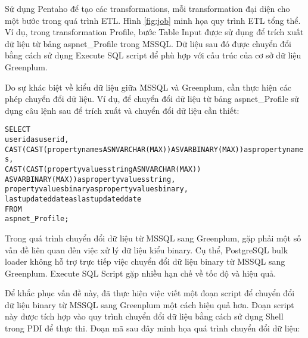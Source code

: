 Sử dụng Pentaho để tạo các transformations, mỗi transformation đại diện cho một bước trong quá trình ETL. Hình \ref{fig:job} minh họa quy trình ETL tổng thể. Ví dụ, trong transformation Profile, bước Table Input được sử dụng để trích xuất dữ liệu từ bảng aspnet\_Profile trong MSSQL. Dữ liệu sau đó được chuyển đổi bằng cách sử dụng Execute SQL script để phù hợp với cấu trúc của cơ sở dữ liệu Greenplum.

Do sự khác biệt về kiểu dữ liệu giữa MSSQL và Greenplum, cần thực hiện các phép chuyển đổi dữ liệu. Ví dụ, để chuyển đổi dữ liệu từ bảng aspnet\_Profile sử dụng câu lệnh sau để trích xuất và chuyển đổi dữ liệu cần thiết:

\begin{mdframed}[backgroundcolor=white, linecolor=black, roundcorner=5pt]
\begin{alltt}
SELECT
    userid as userid,
    CAST(CAST(propertynames AS NVARCHAR(MAX)) AS VARBINARY(MAX)) as propertynames,
    CAST(CAST(propertyvaluesstring AS NVARCHAR(MAX)) 
    AS VARBINARY(MAX)) as propertyvaluesstring,
    propertyvaluesbinary as propertyvaluesbinary,
    lastupdateddate as lastupdateddate
FROM
    aspnet_Profile;
\end{alltt}
\end{mdframed}

Trong quá trình chuyển đổi dữ liệu từ MSSQL sang Greenplum, gặp phải một số vấn đề liên quan đến việc xử lý dữ liệu kiểu binary. Cụ thể, PostgreSQL bulk loader không hỗ trợ trực tiếp việc chuyển đổi dữ liệu binary từ MSSQL sang Greenplum. Execute SQL Script gặp nhiều hạn chế về tốc độ và hiệu quả.

Để khắc phục vấn đề này, đã thực hiện việc viết một đoạn script để chuyển đổi dữ liệu binary từ MSSQL sang Greenplum một cách hiệu quả hơn. Đoạn script này được tích hợp vào quy trình chuyển đổi dữ liệu bằng cách sử dụng Shell trong PDI để thực thi. Đoạn mã sau đây minh họa quá trình chuyển đổi dữ liệu:


